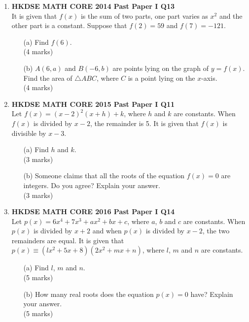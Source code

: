 \documentclass[12pt]{article}
\begin{document}
\begin{enumerate}
	\item \textbf{HKDSE MATH CORE 2014 Past Paper I Q13}\\
	It is given that $f(x)$ is the sum of two parts, one part varies as $x^2$ and the other part is a constant. Suppose that $f(2) = 59$ and $f(7) = -121$.
	\begin{enumerate}
		\item[(a)] Find $f(6)$. \\(4 marks)
		\item[(b)] $A(6, a)$ and $B(-6, b)$ are points lying on the graph of $y = f(x)$. Find the area of $\triangle ABC$, where $C$ is a point lying on the $x$-axis. \\(4 marks)
	\end{enumerate}

	\newpage

	\item \textbf{HKDSE MATH CORE 2015 Past Paper I Q11}\\
	Let $f(x) = (x - 2)^2(x+h)+k$, where $h$ and $k$ are constants. When  $f(x)$ is divided by $x - 2$, the remainder is 5. It is given that  $f(x)$ is divisible by $x - 3$.
	\begin{enumerate}
		\item[(a)] Find $h$ and $k$. \\(3 marks)
		\item[(b)] Someone claims that all the roots of the equation  $f(x) = 0$ are integers. Do you agree? Explain your answer. \\(3 marks)
	\end{enumerate}

	\item \textbf{HKDSE MATH CORE 2016 Past Paper I Q14}\\
	Let $p(x) = 6x^4 + 7x^3 + ax^2 + bx + c$, where $a$, $b$ and $c$ are constants. When $p(x)$ is divided by $x + 2$ and when $p(x)$ is divided by $x - 2$, the two remainders are equal. It is given that $p(x) \equiv (lx^2 + 5x + 8)(2x^2 + mx + n)$, where $l$, $m$ and $n$ are constants.
	\begin{enumerate}
		\item[(a)] Find $l$, $m$ and $n$. \\(5 marks)
		\item[(b)] How many real roots does the equation $p(x) = 0$ have? Explain your answer. \\(5 marks)
	\end{enumerate}


\end{enumerate}
\end{document}
